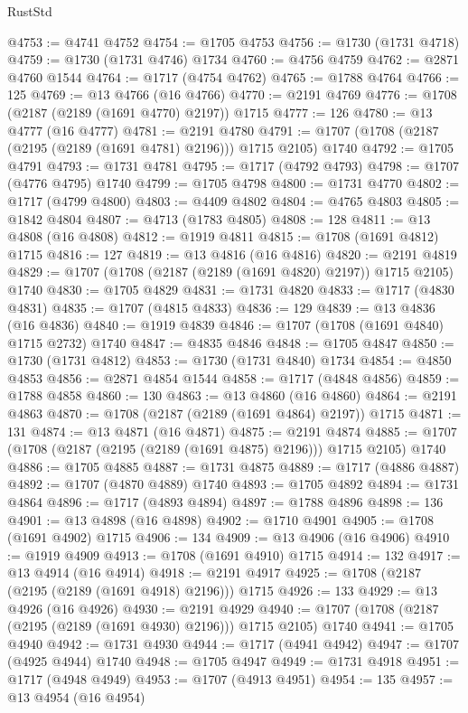 \begin{lexlean}{RustStd}
\begin{coremodule}
@4753 := @4741 @4752
@4754 := @1705 @4753
@4756 := @1730 (@1731 @4718)
@4759 := @1730 (@1731 @4746) @1734
@4760 := @4756 @4759
@4762 := @2871 @4760 @1544
@4764 := @1717 (@4754 @4762)
@4765 := @1788 @4764
@4766 := 125
@4769 := @13 @4766 (@16 @4766)
@4770 := @2191 @4769
@4776 := @1708 (@2187 (@2189 (@1691 @4770) @2197)) @1715
@4777 := 126
@4780 := @13 @4777 (@16 @4777)
@4781 := @2191 @4780
@4791 := @1707 (@1708 (@2187 (@2195 (@2189 (@1691 @4781) @2196))) @1715 @2105) @1740
@4792 := @1705 @4791
@4793 := @1731 @4781
@4795 := @1717 (@4792 @4793)
@4798 := @1707 (@4776 @4795) @1740
@4799 := @1705 @4798
@4800 := @1731 @4770
@4802 := @1717 (@4799 @4800)
@4803 := @4409 @4802
@4804 := @4765 @4803
@4805 := @1842 @4804
@4807 := @4713 (@1783 @4805)
@4808 := 128
@4811 := @13 @4808 (@16 @4808)
@4812 := @1919 @4811
@4815 := @1708 (@1691 @4812) @1715
@4816 := 127
@4819 := @13 @4816 (@16 @4816)
@4820 := @2191 @4819
@4829 := @1707 (@1708 (@2187 (@2189 (@1691 @4820) @2197)) @1715 @2105) @1740
@4830 := @1705 @4829
@4831 := @1731 @4820
@4833 := @1717 (@4830 @4831)
@4835 := @1707 (@4815 @4833)
@4836 := 129
@4839 := @13 @4836 (@16 @4836)
@4840 := @1919 @4839
@4846 := @1707 (@1708 (@1691 @4840) @1715 @2732) @1740
@4847 := @4835 @4846
@4848 := @1705 @4847
@4850 := @1730 (@1731 @4812)
@4853 := @1730 (@1731 @4840) @1734
@4854 := @4850 @4853
@4856 := @2871 @4854 @1544
@4858 := @1717 (@4848 @4856)
@4859 := @1788 @4858
@4860 := 130
@4863 := @13 @4860 (@16 @4860)
@4864 := @2191 @4863
@4870 := @1708 (@2187 (@2189 (@1691 @4864) @2197)) @1715
@4871 := 131
@4874 := @13 @4871 (@16 @4871)
@4875 := @2191 @4874
@4885 := @1707 (@1708 (@2187 (@2195 (@2189 (@1691 @4875) @2196))) @1715 @2105) @1740
@4886 := @1705 @4885
@4887 := @1731 @4875
@4889 := @1717 (@4886 @4887)
@4892 := @1707 (@4870 @4889) @1740
@4893 := @1705 @4892
@4894 := @1731 @4864
@4896 := @1717 (@4893 @4894)
@4897 := @1788 @4896
@4898 := 136
@4901 := @13 @4898 (@16 @4898)
@4902 := @1710 @4901
@4905 := @1708 (@1691 @4902) @1715
@4906 := 134
@4909 := @13 @4906 (@16 @4906)
@4910 := @1919 @4909
@4913 := @1708 (@1691 @4910) @1715
@4914 := 132
@4917 := @13 @4914 (@16 @4914)
@4918 := @2191 @4917
@4925 := @1708 (@2187 (@2195 (@2189 (@1691 @4918) @2196))) @1715
@4926 := 133
@4929 := @13 @4926 (@16 @4926)
@4930 := @2191 @4929
@4940 := @1707 (@1708 (@2187 (@2195 (@2189 (@1691 @4930) @2196))) @1715 @2105) @1740
@4941 := @1705 @4940
@4942 := @1731 @4930
@4944 := @1717 (@4941 @4942)
@4947 := @1707 (@4925 @4944) @1740
@4948 := @1705 @4947
@4949 := @1731 @4918
@4951 := @1717 (@4948 @4949)
@4953 := @1707 (@4913 @4951)
@4954 := 135
@4957 := @13 @4954 (@16 @4954)

\end{coremodule}
\end{lexlean}
